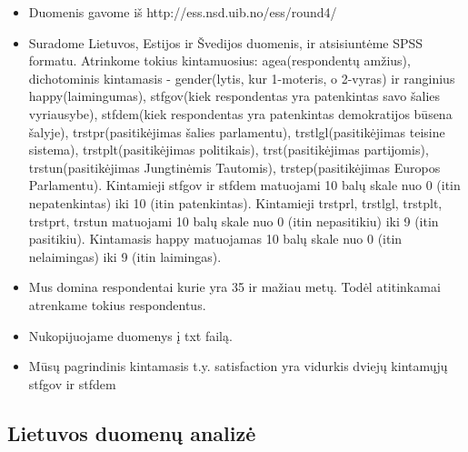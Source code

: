 \documentclass[12pt,a4paper]{article}
\theoremstyle{change}\newtheorem{salyga}{Uždavinys}
\begin{document}
\begin{itemize}
\item Duomenis gavome iš http://ess.nsd.uib.no/ess/round4/
\item Suradome Lietuvos, Estijos ir Švedijos duomenis, ir atsisiuntėme SPSS formatu. Atrinkome tokius kintamuosius: agea(respondentų amžius), dichotominis kintamasis - gender(lytis, kur 1-moteris, o 2-vyras) ir ranginius happy(laimingumas), stfgov(kiek respondentas yra patenkintas savo šalies vyriausybe), stfdem(kiek respondentas yra patenkintas demokratijos būsena šalyje), trstpr(pasitikėjimas šalies parlamentu), trstlgl(pasitikėjimas teisine sistema), trstplt(pasitikėjimas politikais), trst(pasitikėjimas partijomis), trstun(pasitikėjimas Jungtinėmis Tautomis), trstep(pasitikėjimas Europos Parlamentu).
\newline Kintamieji stfgov ir stfdem matuojami 10 balų skale nuo 0 (itin nepatenkintas) iki 10 (itin patenkintas). Kintamieji trstprl, trstlgl, trstplt, trstprt, trstun matuojami 10 balų skale nuo 0 (itin nepasitikiu) iki 9 (itin pasitikiu). Kintamasis happy matuojamas 10 balų skale nuo 0 (itin nelaimingas) iki 9 (itin laimingas).

\item Mus domina respondentai kurie yra 35 ir mažiau metų. Todėl atitinkamai atrenkame tokius respondentus.
\item Nukopijuojame duomenys į txt failą.

\item Mūsų pagrindinis kintamasis t.y. satisfaction yra vidurkis dviejų kintamųjų stfgov ir stfdem

\end{itemize}


\subsection{Lietuvos duomenų analizė}
\end{document}
